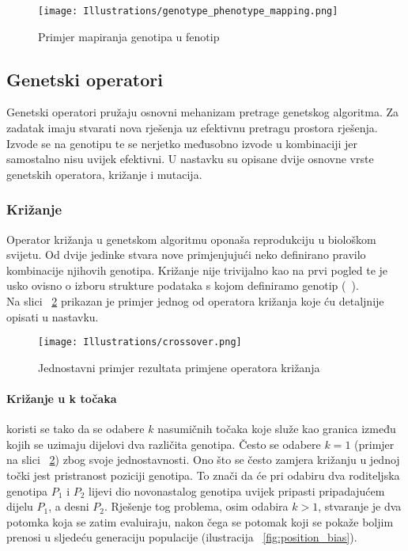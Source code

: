 \begin{figure}
	\centering
	\texttt{[image: Illustrations/genotype\_phenotype\_mapping.png]}
	\caption{Primjer mapiranja genotipa u fenotip}
	\label{fig:genotype_phenotype_map}
\end{figure}

\subsection{Genetski operatori}
Genetski operatori pružaju osnovni mehanizam pretrage genetskog algoritma.
Za zadatak imaju stvarati nova rješenja uz efektivnu pretragu prostora rješenja.
Izvode se na genotipu te se nerjetko međusobno izvode u kombinaciji jer samostalno nisu uvijek efektivni.
U nastavku su opisane dvije osnovne vrste genetskih operatora, križanje i mutacija.

\subsubsection{Križanje}
Operator križanja u genetskom algoritmu oponaša reprodukciju u biološkom svijetu.
Od dvije jedinke stvara nove primjenjujući neko definirano pravilo kombinacije njihovih genotipa.
Križanje nije trivijalno kao na prvi pogled te je usko ovisno o izboru strukture podataka s kojom definiramo genotip (~\cite{wong2015evolutionary}). \\
Na slici ~\ref{fig:crossover} prikazan je primjer jednog od operatora križanja koje ću detaljnije opisati u nastavku.

\begin{figure}
	\texttt{[image: Illustrations/crossover.png]}
	\caption{Jednostavni primjer rezultata primjene operatora križanja}
	\label{fig:crossover}
\end{figure}

\paragraph{Križanje u k točaka}
koristi se tako da se odabere $k$ nasumičnih točaka koje služe kao granica između kojih se uzimaju dijelovi dva različita genotipa.
Često se odabere $k = 1$ (primjer na slici ~\ref{fig:crossover}) zbog svoje jednostavnosti.
Ono što se često zamjera križanju u jednoj točki jest pristranost poziciji genotipa.
To znači da će pri odabiru dva roditeljska genotipa $P_1$ i $P_2$ lijevi dio novonastalog genotipa uvijek pripasti pripadajućem dijelu $P_1$, a desni $P_2$.
Rješenje tog problema, osim odabira $k > 1$, stvaranje je dva potomka koja se zatim evaluiraju, nakon čega se potomak koji se pokaže boljim prenosi u sljedeću generaciju populacije (ilustracija ~\ref{fig:position_bias}).

